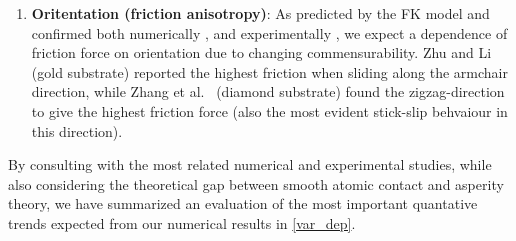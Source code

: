 \begin{enumerate}


  

  \item \textbf{Oritentation (friction anisotropy)}: As predicted by the FK model and confirmed both numerically \cite{zhu_study_2018}, \cite{ma12091425} and experimentally \cite{DIENWIEBEL2005197}, \cite{feng_superlubric_2013} we expect a dependence of friction force on orientation due to changing commensurability. Zhu and Li \cite{zhu_study_2018} (gold substrate) reported the highest friction when sliding along the armchair direction, while Zhang et al.\ \cite{ma12091425} (diamond substrate) found the zigzag-direction to give the highest friction force (also the most evident stick-slip behvaiour in this direction). 
\end{enumerate}


By consulting with the most related numerical and experimental studies, while also considering the theoretical gap between smooth atomic contact and asperity theory, we have summarized an evaluation of the most important quantative trends expected from our numerical results in \cref{var_dep}. 


